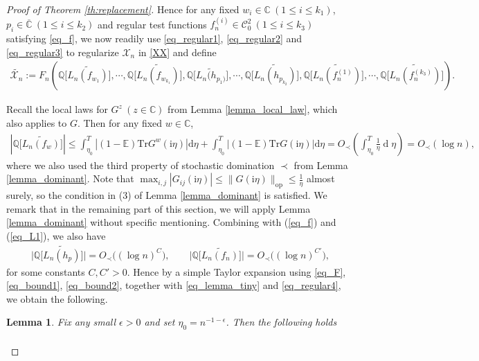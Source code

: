 \documentclass[10pt,reqno]{amsart}
\numberwithin{equation}{section}
\numberwithin{figure}{section}
\theoremstyle{plain}
\newtheorem{lemma}[theorem]{Lemma}
\newcommand{\C}{{\mathbb{C}}}
\newcommand{\ii}{\mathrm{i}}
\newcommand{\wt}{\widetilde}
\newcommand{\<}{\langle}
\renewcommand{\>}{\rangle}
\newcommand{\E}{\mathbb{E}}
\newcommand{\dd}{\operatorname{d}\!{}}
\begin{document}
\begin{proof}[Proof of Theorem \ref{th:replacement}]
Hence for any fixed $w_i\in \C~(1\leq i \leq k_1)$, $p_i\in \overline{\C}~(1\leq i \leq k_2)$ and regular test functions $f^{(i)}_n\in \mathcal{C}_0^2~(1\leq i \leq k_3) $ satisfying \eqref{eq_f},  we now readily use \eqref{eq_regular1}, \eqref{eq_regular2} and \eqref{eq_regular3} to regularize $\mathcal{X}_n$ in \eqref{XX} and define 
\begin{align}\label{eq_XX}	\wt{\mathcal{X}_n}:=F_n\left(\mathbb{Q}\big[\wt{L_n(f_{w_1})}\big], \cdots , \mathbb{Q}\big[\wt{L_n(f_{w_{k_1}})}\big], \mathbb{Q}\big[\wt{L_n(h_{p_1)}}\big], \cdots , \mathbb{Q}\big[\wt{L_n(h_{p_{k_2}})}\big],\mathbb{Q}\big[\wt{L_n(f_n^{(1)})}\big],\cdots, \mathbb{Q}\big[\wt{L_n(f_n^{(k_3)})}\big] \right).
\end{align}



Recall the local laws for $G^z~(z\in \C)$ from Lemma \ref{lemma_local_law}, which also applies to $G$. Then for any fixed $w\in \C$, 
\begin{align}\label{eq_bound1}
	\left|\mathbb{Q}\big[\wt{L_n(f_{w})}\big]\right| 
    \leq \int_{\eta_0}^{T} \left| (1-\E) \mathrm{Tr}  G^{w}(\ii \eta)\right| \mathrm{d} \eta+ \int_{\eta_0}^{T} \left| (1-\E) \mathrm{Tr} G(\ii \eta) \right| \mathrm{d} \eta
    =O_\prec\left(\int_{\eta_0}^{T} \frac{1}{\eta} \dd \eta \right)=O_{\prec}(\log n),
\end{align}
where we also used the third property of stochastic domination $\prec$ from Lemma \ref{lemma_dominant}. Note that $\max_{i,j} |G_{ij}(\ii \eta)|  \leq \|G(\ii \eta)\|_{\mathrm{op}} \leq \frac{1}{\eta}$ almost surely, so the condition in (3) of Lemma \ref{lemma_dominant} is satisfied. We remark that in the remaining part of this section, we will apply Lemma \ref{lemma_dominant} without specific mentioning.  Combining with (\ref{eq_f}) and (\ref{eq_L1}), we also have
\begin{align}\label{eq_bound2}
	\Big|\mathbb{Q}\big[\wt{L_n(h_{p})}\big]\Big|=O_\prec \Big((\log n)^C\Big), \qquad \Big|\mathbb{Q}\big[\wt{L_n(f_{n})}\big]\Big| =O_\prec \Big((\log n)^{C'}\Big),
\end{align}
for some constants $C,C'>0$.
Hence by a simple Taylor expansion using \eqref{eq_F}, \eqref{eq_bound1}, \eqref{eq_bound2}, together with  \eqref{eq_lemma_tiny} and \eqref{eq_regular4},  we obtain the following.
\begin{lemma}\label{lemma_regular}
Fix any small $\epsilon>0$ and set $\eta_0=n^{-1-\epsilon}$. Then the following holds
\begin{align}\label{eq_tiny}

\end{align}
\end{lemma}
\end{proof}
\end{document}
